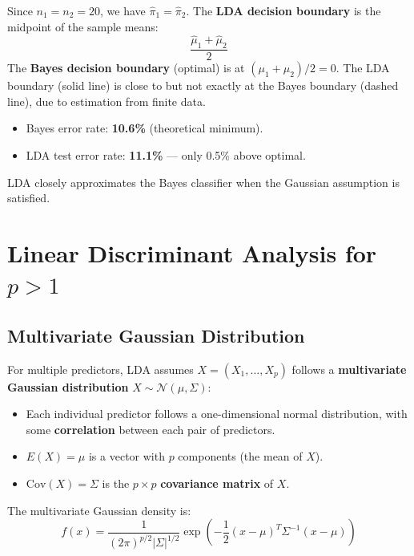 \documentclass[11pt,a4paper]{article}
\theoremstyle{definition}
\theoremstyle{plain}
\theoremstyle{remark}
\begin{document}
Since $n_1 = n_2 = 20$, we have $\hat{\pi}_1 = \hat{\pi}_2$. The \textbf{LDA decision boundary} is the midpoint of the sample means:
\[
    \frac{\hat{\mu}_1 + \hat{\mu}_2}{2}
\]
The \textbf{Bayes decision boundary} (optimal) is at $(\mu_1 + \mu_2)/2 = 0$. The LDA boundary (solid line) is close to but not exactly at the Bayes boundary (dashed line), due to estimation from finite data.

\begin{tcolorbox}[colback=green!5!white,colframe=green!75!black,title=\textbf{LDA Performance}]
\begin{itemize}
    \item Bayes error rate: \textbf{10.6\%} (theoretical minimum).
    \item LDA test error rate: \textbf{11.1\%} — only 0.5\% above optimal.
\end{itemize}
LDA closely approximates the Bayes classifier when the Gaussian assumption is satisfied.
\end{tcolorbox}

\section{Linear Discriminant Analysis for \texorpdfstring{$p > 1$}{p>1}}

\subsection{Multivariate Gaussian Distribution}

For multiple predictors, LDA assumes $X = (X_1, \ldots, X_p)$ follows a \textbf{multivariate Gaussian distribution} $X \sim \mathcal{N}(\mu, \Sigma)$:
\begin{itemize}
    \item Each individual predictor follows a one-dimensional normal distribution, with some \textbf{correlation} between each pair of predictors.
    \item $E(X) = \mu$ is a vector with $p$ components (the mean of $X$).
    \item $\mathrm{Cov}(X) = \Sigma$ is the $p \times p$ \textbf{covariance matrix} of $X$.
\end{itemize}

The multivariate Gaussian density is:
\[
    f(x) = \frac{1}{(2\pi)^{p/2} |\Sigma|^{1/2}} \exp\!\left(-\frac{1}{2}(x - \mu)^T \Sigma^{-1}(x - \mu)\right)
\]
\end{document}
